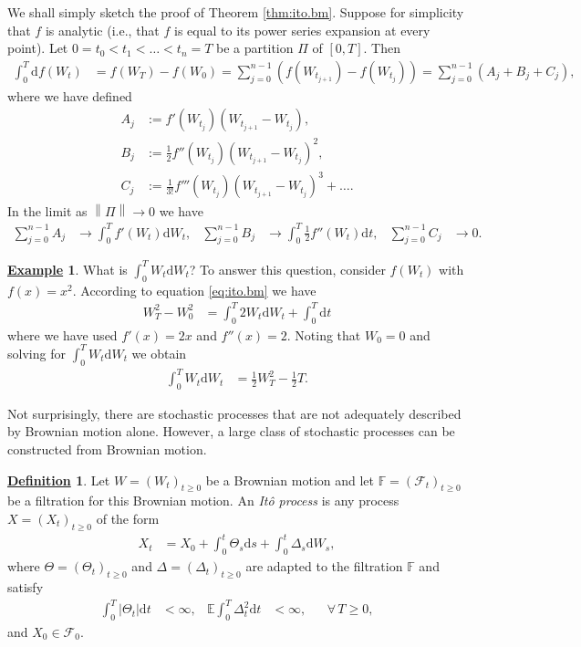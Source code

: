 \documentclass[12pt]{book}
\numberwithin{equation}{chapter}
\theoremstyle{plain}
\numberwithin{theorem}{section}
\theoremstyle{definition}
\newtheorem{definition}[theorem]{\underline{Definition}}
\newtheorem{example}[theorem]{\underline{Example}}
\numberwithin{exercise}{chapter}
\let\oldendproof\endproof
\renewenvironment{proof}[1][\proofname]{%
  \oldproof[\scshape\underline{#1}]%
}{\oldendproof}
\newcommand{\<}{\langle}
\renewcommand{\>}{\rangle}
\renewcommand{\(}{\left(}
\renewcommand{\)}{\right)}
\renewcommand{\[}{\left[}
\renewcommand{\]}{\right]}
\newcommand\Eb{\mathds{E}}
\newcommand\Fb{\mathds{F}}
\newcommand\Fc{\mathscr{F}}
\newcommand\Del{\Delta}
\newcommand\dd{\mathrm{d}}
\newcommand{\norm}[1]{\left\|#1\right\|}
\begin{document}
\begin{proof}
We shall simply sketch the proof of Theorem \ref{thm:ito.bm}.
Suppose for simplicity that $f$ is analytic (i.e., that $f$ is equal to its power series expansion at every point).  
Let $0 = t_0 < t_1 < \ldots < t_n = T$ be a partition $\Pi$ of $[0,T]$.
Then
\begin{align}
\int_0^T \dd f(W_t)
	&=	f(W_T) - f(W_0) 
	=		\sum_{j=0}^{n-1} \( f(W_{t_{j+1}}) - f(W_{t_j}) \) 
	=		\sum_{j=0}^{n-1} \( A_j + B_j + C_j \) ,
\end{align}
where we have defined
\begin{align}
A_j
	&:=	f'(W_{t_j}) \( W_{t_{j+1}} - W_{t_j} \) , \\
B_j
	&:=  \tfrac{1}{2} f''(W_{t_j}) \( W_{t_{j+1}} - W_{t_j} \)^2 , \\
C_j
	&:=	\tfrac{1}{3!} f'''(W_{t_j}) \( W_{t_{j+1}} - W_{t_j} \)^3 + \ldots .
\end{align}
In the limit as $\norm{\Pi} \to 0$ we have
\begin{align}
\sum_{j=0}^{n-1} A_j
	&\to \int_0^T f'(W_t) \dd W_t , &
\sum_{j=0}^{n-1} B_j
	&\to \int_0^T \tfrac{1}{2} f''(W_t) \dd t , &
\sum_{j=0}^{n-1} C_j
	&\to 0 .
\end{align}
\end{proof}

\begin{example}
\label{ex:WdW}
What is $\int_0^T W_t \dd W_t$?  To answer this question, consider $f(W_t)$ with $f(x) = x^2$.  According to equation \eqref{eq:ito.bm} we have
\begin{align}
W_T^2 - W_0^2
	&=	\int_0^T 2 W_t \dd W_t + \int_0^T \dd t
\end{align}
where we have used $f'(x) = 2 x$ and $f''(x) = 2$.  Noting that $W_0 = 0$ and solving for $\int_0^T W_t \dd W_t$ we obtain
\begin{align}
\int_0^T W_t \dd W_t
	&=	\tfrac{1}{2} W_T^2 - \tfrac{1}{2} T .
\end{align}
\end{example}

\noindent
Not surprisingly, there are stochastic processes that are not adequately described by Brownian motion alone.  However, a large class of stochastic processes can be constructed from Brownian motion.

\begin{definition}
\label{def:ito.process}
Let $W = (W_t)_{t \geq 0}$ be a Brownian motion and let $\Fb=(\Fc_t)_{t \geq 0}$ be a filtration for this Brownian motion.  An \emph{It\^o process} is any process $X = (X_t)_{t \geq 0}$ of the form
\begin{align}
X_t
	&= X_0 + \int_0^t \Theta_s \dd s + \int_0^t \Del_s \dd W_s  , \label{eq:ito.process}
\end{align}
where $\Theta = (\Theta_t)_{t \geq 0}$ and $\Del = (\Del_t)_{t \geq 0}$ are adapted to the filtration $\Fb$ and satisfy
\begin{align}
\int_0^T | \Theta_t | \dd t 
	&< \infty , &
\Eb \int_0^T \Del_t^2 \dd t
	&< \infty , &
	&\forall \, T \geq 0 ,
\end{align}
and $X_0 \in \Fc_0$.
\end{definition}
\end{document}
